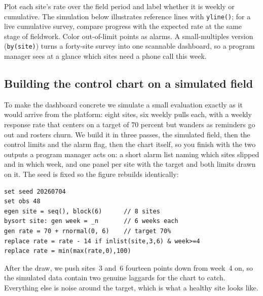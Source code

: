 \begin{vizcallout}
Plot each site's rate over the field period and label whether it is weekly or cumulative. The simulation below illustrates reference lines with \texttt{yline()}; for a live cumulative survey, compare progress with the expected rate at the same stage of fieldwork. Color out-of-limit points as alarms. A small-multiples version (\texttt{by(site)}) turns a forty-site survey into one scannable dashboard, so a program manager sees at a glance which sites need a phone call this week.
\end{vizcallout}

\subsection{Building the control chart on a simulated field}\label{sec:monitor-build}
To make the dashboard concrete we simulate a small evaluation exactly as it would arrive from the platform: eight sites, six weekly pulls each, with a weekly response rate that centers on a target of 70 percent but wanders as reminders go out and rosters churn. We build it in three passes, the simulated field, then the control limits and the alarm flag, then the chart itself, so you finish with the two outputs a program manager acts on: a short alarm list naming which sites slipped and in which week, and one panel per site with the target and both limits drawn on it. The seed is fixed so the figure rebuilds identically:
\par
{\footnotesize
\begin{verbatim}
set seed 20260704
set obs 48
egen site = seq(), block(6)      // 8 sites
bysort site: gen week = _n       // 6 weeks each
gen rate = 70 + rnormal(0, 6)    // target 70%
replace rate = rate - 14 if inlist(site,3,6) & week>=4
replace rate = min(max(rate,0),100)
\end{verbatim}
}
After the draw, we push sites~3 and~6 fourteen points down from week~4 on, so the simulated data contain two genuine laggards for the chart to catch. Everything else is noise around the target, which is what a healthy site looks like.

